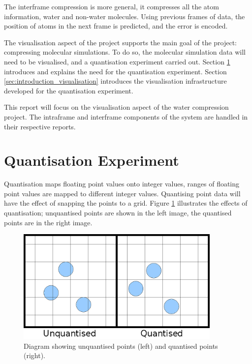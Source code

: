 The interframe compression is more general, it compresses all the atom
information, water and non-water molecules. Using previous frames of data, the
position of atoms in the next frame is predicted, and the error is encoded.

The visualisation aspect of the project supports the main goal of the project:
compressing molecular simulations. To do so, the molecular simulation data will
need to be visualised, and a quantisation experiment carried out. Section
\ref{sec:introduction_quantisation} introduces and explains the need for the
quantisation experiment. Section \ref{sec:introduction_visualisation}
introduces the visualisation infrastructure developed for the quantisation
experiment.

This report will focus on the visualisation aspect of the water compression
project. The intraframe and interframe components of the system are handled in
their respective reports.


\section{Quantisation Experiment}
\label{sec:introduction_quantisation}

Quantisation maps floating point values onto integer values, ranges of floating
point values are mapped to different integer values. Quantising point data
will have the effect of snapping the points to a grid. Figure
\ref{fig:introduction_quantisation} illustrates the effects of quantisation;
unquantised points are shown in the left image, the quantised points are in the
right image.

\begin{figure}
  \begin{center}
    \includegraphics[width=100mm]{quantisation}
  \end{center}
  \caption{Diagram showing unquantised points (left) and quantised points
  (right).}
  \label{fig:introduction_quantisation}
\end{figure}

